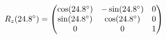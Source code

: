 \documentclass[preview]{standalone}
\begin{document}
\begin{align*}
\special{dvisvgm:raw <g id='unique000'>}R_z(24.8^\circ) = \begin{pmatrix} \cos(24.8^\circ) & -\sin(24.8^\circ) & 0 \\ \sin(24.8^\circ) & \cos(24.8^\circ) & 0 \\ 0 & 0 & 1 \end{pmatrix}\special{dvisvgm:raw </g>}
\end{align*}
\end{document}
